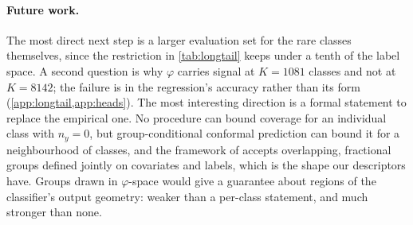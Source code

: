 \paragraph{Future work.} The most direct next step is a larger evaluation set for the rare
classes themselves, since the restriction in \cref{tab:longtail} keeps under a tenth of the
label space. A second question is why $\varphi$ carries signal at $K=1081$ classes and not at
$K=8142$; the failure is in the regression's accuracy rather than its form
(\cref{app:longtail,app:heads}). The
most interesting direction is a formal statement to replace the empirical one. No procedure can
bound coverage for an individual class with $n_y=0$, but group-conditional conformal prediction
can bound it for a neighbourhood of classes, and the framework of
\citet{bairaktari2025kandinsky} accepts overlapping, fractional groups defined jointly on
covariates and labels, which is the shape our descriptors have. Groups drawn in
$\varphi$-space would give a guarantee about regions of the classifier's output geometry:
weaker than a per-class statement, and much stronger than none.
